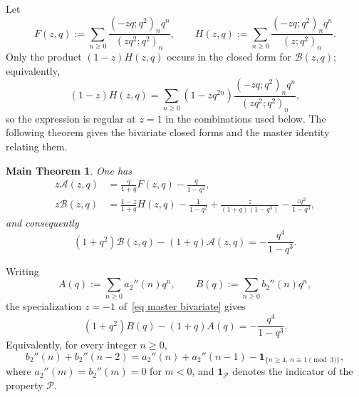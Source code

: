 \documentclass[10pt,a4paper]{amsart}
\newtheorem*{maintheorem} {Main Theorem}
\numberwithin{equation}{section}
\begin{document}
Let
\[
F(z,q):=\sum_{n\ge 0}\frac{(-zq;q^2)_n q^n}{(zq^2;q^2)_n},
\qquad
H(z,q):=\sum_{n\ge 0}\frac{(-zq;q^2)_n q^n}{(z;q^2)_n}.
\]
Only the product $(1-z)H(z,q)$ occurs in the closed form for $\mathcal B(z,q)$; equivalently,
\[
(1-z)H(z,q)=\sum_{n\ge0}(1-zq^{2n})\frac{(-zq;q^2)_nq^n}{(zq^2;q^2)_n},
\]
so the expression is regular at $z=1$ in the combinations used below.
The following theorem gives the bivariate closed forms and the master identity relating them.

\begin{maintheorem}
One has
\begin{align}
z\mathcal A(z,q)&=\frac{q}{1+q}F(z,q)-\frac{q}{1-q^2}, \label{eq zA-closed}\\
z\mathcal B(z,q)&=\frac{1-z}{1+q}H(z,q)-\frac{1}{1-q^2}
+\frac{z}{(1+q)(1-q^3)}-\frac{zq^2}{1-q^3}, \label{eq zB-closed}
\end{align}
and consequently
\begin{equation}\label{eq master bivariate}
(1+q^2)\mathcal B(z,q)-(1+q)\mathcal A(z,q)=-\frac{q^4}{1-q^3}.
\end{equation}
\end{maintheorem}


Writing
\[
A(q):=\sum_{n\ge 0} a_2''(n)q^n,\qquad B(q):=\sum_{n\ge 0} b_2''(n)q^n,
\]
the specialization $z=-1$ of~\eqref{eq master bivariate} gives
\begin{equation}\label{eq weighted relation}
(1+q^2)B(q)-(1+q)A(q)=-\frac{q^4}{1-q^3}.
\end{equation}
Equivalently, for every integer $n\ge 0$,
\begin{equation}\label{eq weighted relation coeff}
b_2''(n)+b_2''(n-2)=a_2''(n)+a_2''(n-1)-\mathbf 1_{\{n\ge4,\ n\equiv1\pmod 3\}},
\end{equation}
where $a_2''(m)=b_2''(m)=0$ for $m<0$, and $\mathbf 1_{\mathcal P}$ denotes the indicator of the property $\mathcal P$.
\end{document}
